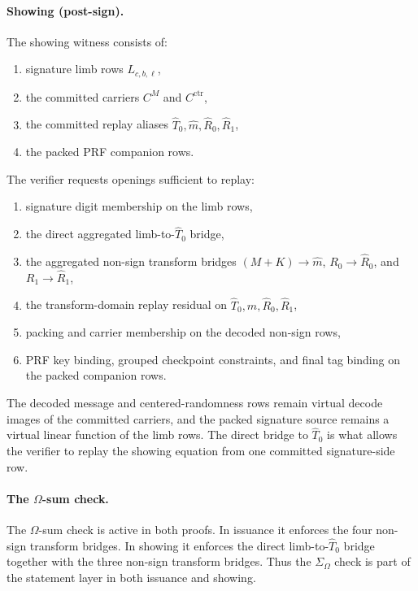 \paragraph{Showing (post-sign).}
The showing witness consists of:
\begin{enumerate}[leftmargin=1.25em]
  \item signature limb rows \(L_{c,b,\ell}\),
  \item the committed carriers \(C^M\) and \(C^{\mathrm{ctr}}\),
  \item the committed replay aliases
  \(\widehat T_0,\widehat m,\widehat R_0,\widehat R_1\),
  \item the packed PRF companion rows.
\end{enumerate}
The verifier requests openings sufficient to replay:
\begin{enumerate}[leftmargin=1.25em]
  \item signature digit membership on the limb rows,
  \item the direct aggregated limb-to-\(\widehat T_0\) bridge,
  \item the aggregated non-sign transform bridges
  \((M+K)\!\to\!\widehat m\),
  \(R_0\!\to\!\widehat R_0\), and
  \(R_1\!\to\!\widehat R_1\),
  \item the transform-domain replay residual on
  \(\widehat T_0,\widehat m,\widehat R_0,\widehat R_1\),
  \item packing and carrier membership on the decoded non-sign rows,
  \item PRF key binding, grouped checkpoint constraints, and final tag binding
  on the packed companion rows.
\end{enumerate}
The decoded message and centered-randomness rows remain virtual decode images of
the committed carriers, and the packed signature source remains a virtual linear
function of the limb rows. The direct bridge to \(\widehat T_0\) is what allows
the verifier to replay the showing equation from one committed signature-side
row.

\paragraph{The \(\Omega\)-sum check.}
The \(\Omega\)-sum check is active in both proofs. In issuance it enforces the
four non-sign transform bridges. In showing it enforces the direct
limb-to-\(\widehat T_0\) bridge together with the three non-sign transform
bridges. Thus the \(\Sigma_\Omega\) check is part of the statement layer in
both issuance and showing.


